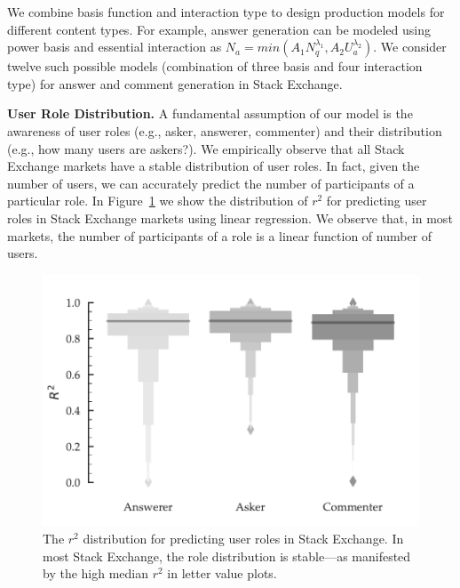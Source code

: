 \begin{table}[h!]
\begin{tabular}{m{}c}
\begin{minipage}{.17\textwidth}
    \end{minipage}
    \\
    \bottomrule
  \end{tabular}
  \vspace{-\baselineskip}
\end{table}

We combine basis function and interaction type to design production models for different content types. For example, answer generation can be modeled using power basis and essential interaction as $N_a = min(A_1N_q^{\lambda_1},A_2U_a^{\lambda_2})$. We consider twelve such possible models (combination of three basis and four interaction type) for answer and comment generation in Stack Exchange.

\textbf{User Role Distribution.} A fundamental assumption of our model is the awareness of user roles (e.g., asker, answerer, commenter) and their distribution (e.g., how many users are askers?). We empirically observe that all Stack Exchange markets have a stable distribution of user roles. In fact, given the number of users, we can accurately predict the number of participants of a particular role. In Figure~\ref{fig:roles} we show the distribution of $r^2$ for predicting user roles in Stack Exchange markets using linear regression. We observe that, in most markets, the number of participants of a role is a linear function of number of users.

\begin{figure}[hbt]
\vspace{-\baselineskip}
\centering
\includegraphics[scale=0.45]{Figures/User_to_Roles_R_Squared_LV.pdf}
\vspace{-\baselineskip}
\caption{The $r^2$ distribution for predicting user roles in Stack Exchange. In most Stack Exchange, the role distribution is stable---as manifested by the high median $r^2$ in letter value plots.}
\vspace{-\baselineskip}
\label{fig:roles}
\end{figure}

